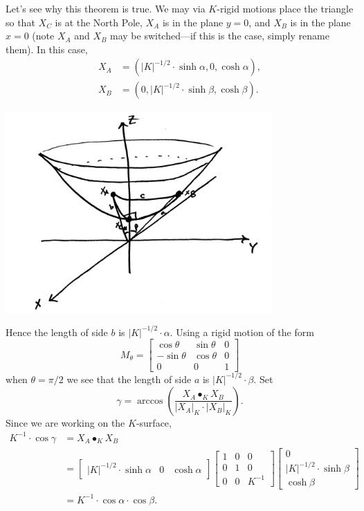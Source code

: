 \documentclass{ximera}
\begin{document}
Let's see why this theorem is true.  We may via $K$-rigid motions
place the triangle so that $X_C$ is at the North Pole, $X_A$ is in the
plane $y=0$, and $X_B$ is in the plane $x=0$ (note $X_A$ and $X_B$ may
be switched---if this is the case, simply rename them). In this case,
\begin{align*}
  X_A &= (|K|^{-1/2}\cdot \sinh\alpha, 0, \cosh\alpha),\\
  X_B &= (0, |K|^{-1/2}\cdot \sinh \beta, \cosh\beta).
\end{align*}
\begin{image}
  \includegraphics[width=4in]{hypPythag.png}
\end{image}
Hence the length of side $b$ is $|K|^{-1/2}\cdot\alpha$. Using a rigid motion of the form
\[
M_\theta=
\begin{bmatrix}
  \cos\theta & \sin\theta & 0\\
  -\sin\theta & \cos\theta & 0\\
  0 & 0 & 1
\end{bmatrix}
\]
when $\theta = \pi/2$ we see that the length of side $a$ is $|K|^{-1/2}\cdot
\beta$. Set
\[
\gamma = \arccos\left(\frac{X_A\bullet_K X_B}{|X_A|_K\cdot |X_B|_K}\right).
\]
Since we are working on the $K$-surface,
\begin{align*}
  K^{-1}\cdot \cos \gamma &= X_A\bullet_K X_B\\
  &=
  \begin{bmatrix}
    |K|^{-1/2}\cdot \sinh\alpha &  0 & \cosh\alpha
  \end{bmatrix}
    \begin{bmatrix}
      1 & 0 & 0\\
      0 & 1 & 0\\
      0 & 0 & K^{-1}
    \end{bmatrix}
    \begin{bmatrix}
      0\\
      |K|^{-1/2}\cdot\sinh\beta\\
      \cosh\beta
    \end{bmatrix}\\
   &=K^{-1} \cdot \cos\alpha \cdot \cos\beta.
  \end{align*}
\end{document}
